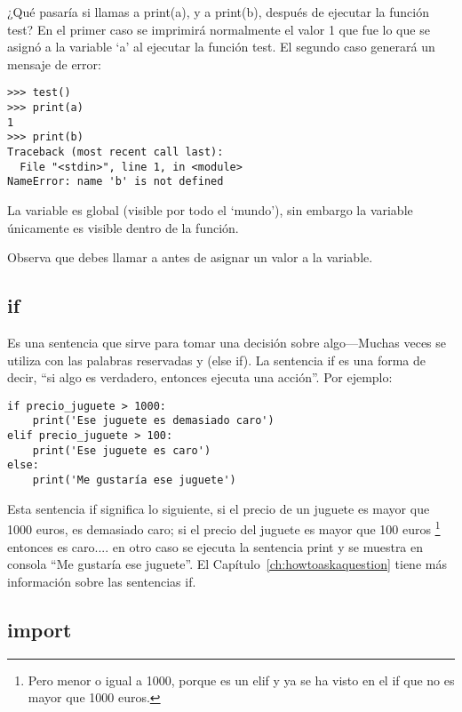 ¿Qué pasaría si llamas a print(a), y a print(b), después de ejecutar la función test?  En el primer caso se imprimirá normalmente el valor 1 que fue lo que se asignó a la variable `a' al ejecutar la función test. El segundo caso generará un mensaje de error:

\begin{listing}
\begin{verbatim}
>>> test()
>>> print(a)
1
>>> print(b)
Traceback (most recent call last):
  File "<stdin>", line 1, in <module>
NameError: name 'b' is not defined
\end{verbatim}
\end{listing}

La variable  es global (visible por todo el `mundo'), sin embargo la variable  únicamente es visible dentro de la función.  

Observa que debes llamar a  antes de asignar un valor a la variable.

\subsection*{if}

Es una sentencia que sirve para tomar una decisión sobre algo---Muchas veces se utiliza con las palabras reservadas  y  (else if).  La sentencia if es una forma de decir, ``si algo es verdadero, entonces ejecuta una acción''.  Por ejemplo:

\begin{listing}
\begin{verbatim}
if precio_juguete > 1000:
    print('Ese juguete es demasiado caro')
elif precio_juguete > 100:
    print('Ese juguete es caro')
else:
    print('Me gustaría ese juguete')
\end{verbatim}
\end{listing}

Esta sentencia if significa lo siguiente, si el precio de un juguete es mayor que 1000 euros, es demasiado caro; si el precio del juguete es mayor que 100 euros \footnote{Pero menor o igual a 1000, porque es un elif y ya se ha visto en el if que no es mayor que 1000 euros.} entonces es caro.... en otro caso se ejecuta la sentencia print y se muestra en consola ``Me gustaría ese juguete''. El Capítulo~\ref{ch:howtoaskaquestion} tiene más información sobre las sentencias if.

\subsection*{import}

